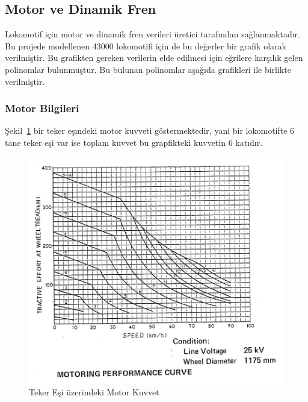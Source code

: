\documentclass[10pt,a4paper]{article}
\begin{document}
\subsection{Motor ve Dinamik Fren}
Lokomotif için motor ve dinamik fren verileri üretici tarafından sağlanmaktadır. Bu projede modellenen 43000 lokomotifi için de bu değerler bir grafik olarak verilmiştir. Bu grafikten gereken verilerin elde edilmesi için eğrilere karşılık gelen polinomlar bulunmuştur. Bu bulunan polinomlar aşağıda grafikleri ile birlikte verilmiştir.

\subsubsection{Motor Bilgileri}
Şekil~\ref{image:motor_kuvveti} bir teker eşındeki motor kuvveti göstermektedir, yani bir lokomotifte 6 tane teker eşi var ise toplam kuvvet bu grapfikteki kuvvetin 6 katıdır.

\begin{figure}[!h]
\shorthandoff{=}
\centering
\caption{Teker Eşi üzerindeki Motor Kuvvet}
\label{image:motor_kuvveti}
\includegraphics[scale=0.7]{resimler/motor.png} 
\end{figure}
\end{document}
